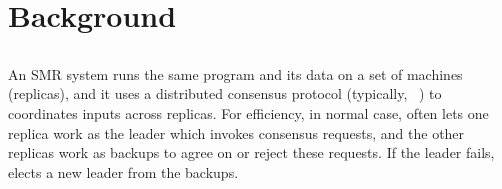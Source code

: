 \section{Background} \label{sec:background}


\subsection{\paxos}\label{sec:paxos}
An SMR system runs the same program and its data on a set of machines 
(replicas), and it uses a distributed consensus protocol (typically, 
\paxos~\cite{paxos:complex,paxos,paxos:simple,paxos:live,paxos:fast,
paxos:practical}) to coordinates inputs across replicas. For efficiency, in 
normal case, \paxos often lets one replica work as the leader which invokes 
consensus requests, and the other replicas work as backups to agree on or 
reject 
these requests. If the leader fails, \paxos elects a new leader from the 
backups.

% 



